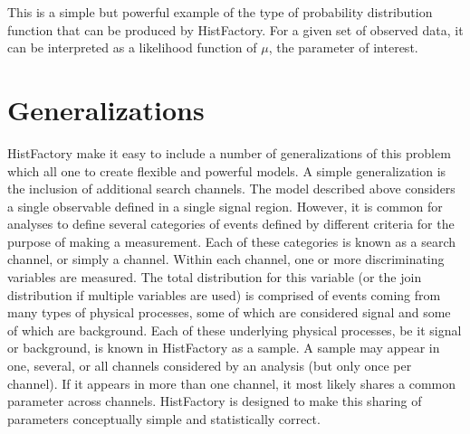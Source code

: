 
This is a simple but powerful example of the type of probability distribution function that can be produced by HistFactory.
For a given set of observed data, it can be interpreted as a likelihood function of $\mu$, the parameter of interest.



\section{Generalizations}

HistFactory make it easy to include a number of generalizations of this problem which all one to create flexible and powerful models.
A simple generalization is the inclusion of additional search channels.
The model described above considers a single observable defined in a single signal region.
However, it is common for analyses to define several categories of events defined by different criteria for the purpose of making a measurement.
Each of these categories is known as a search channel, or simply a channel.
Within each channel, one or more discriminating variables are measured.
The total distribution for this variable (or the join distribution if multiple variables are used) is comprised of events coming from many types of physical processes, 
some of which are considered signal and some of which are background.
Each of these underlying physical processes, be it signal or background, is known in HistFactory as a sample.
A sample may appear in one, several, or all channels considered by an analysis (but only once per channel).
If it appears in more than one channel, it most likely shares a common parameter across channels.
HistFactory is designed to make this sharing of parameters conceptually simple and statistically correct.

